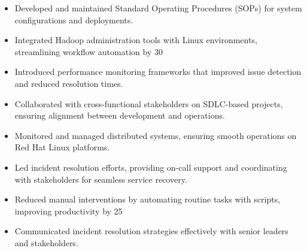 \par\smallskip
\noindent
\begin{minipage}{20cm}
  \begin{minipage}{9.75cm}
    \begin{itemize}
      \item Developed and maintained Standard Operating Procedures (SOPs) for system configurations and deployments.
      \item Integrated Hadoop administration tools with Linux environments, streamlining workflow automation by 30%
    \end{itemize}
  \end{minipage}
  \hfill
  \begin{minipage}{9.75cm}
    \begin{itemize}
      \item Introduced performance monitoring frameworks that improved issue detection and reduced resolution times.
      \item Collaborated with cross-functional stakeholders on SDLC-based projects, ensuring alignment between development and operations.
    \end{itemize}
  \end{minipage}
\end{minipage}
\par\smallskip
\divider

\par\smallskip
\noindent
\begin{minipage}{20cm}
  \begin{minipage}{9.75cm}
    \begin{itemize}
      \item Monitored and managed distributed systems, ensuring smooth operations on Red Hat Linux platforms.
      \item Led incident resolution efforts, providing on-call support and coordinating with stakeholders for seamless service recovery.
    \end{itemize}
  \end{minipage}
  \hfill
  \begin{minipage}{9.75cm}
    \begin{itemize}
      \item Reduced manual interventions by automating routine tasks with scripts, improving productivity by 25%
      \item Communicated incident resolution strategies effectively with senior leaders and stakeholders.
    \end{itemize}
  \end{minipage}
\end{minipage}

